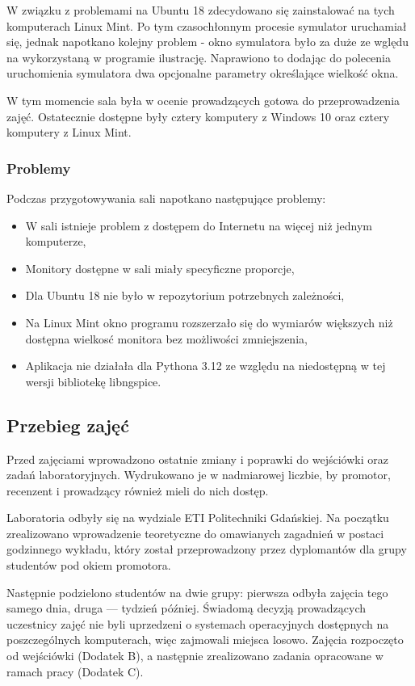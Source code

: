 W związku z problemami na Ubuntu 18 zdecydowano się zainstalować na tych komputerach Linux Mint. Po tym czasochłonnym procesie symulator uruchamiał się, jednak napotkano kolejny problem - okno symulatora było za duże ze wględu na wykorzystaną w programie ilustrację. Naprawiono to dodając do polecenia uruchomienia symulatora dwa opcjonalne parametry określające wielkość okna. 

W tym momencie sala była w ocenie prowadzących gotowa do przeprowadzenia zajęć. Ostatecznie dostępne były cztery komputery z Windows 10 oraz cztery komputery z Linux Mint.

\subsubsection{Problemy}
Podczas przygotowywania sali napotkano następujące problemy:
\begin{itemize}
    \item W sali istnieje problem z dostępem do Internetu na więcej niż jednym komputerze,
    \item Monitory dostępne w sali miały specyficzne proporcje,
    \item Dla Ubuntu 18 nie było w repozytorium potrzebnych zależności,
    \item Na Linux Mint okno programu rozszerzało się do wymiarów większych niż dostępna wielkosć monitora bez możliwości zmniejszenia,
    \item Aplikacja nie działała dla Pythona 3.12 ze względu na niedostępną w tej wersji bibliotekę libngspice.
\end{itemize}

\subsection{Przebieg zajęć}

Przed zajęciami wprowadzono ostatnie zmiany i poprawki do wejściówki oraz zadań laboratoryjnych. Wydrukowano je w nadmiarowej liczbie, by promotor, recenzent i prowadzący również mieli do nich dostęp.

Laboratoria odbyły się na wydziale ETI Politechniki Gdańskiej. Na początku zrealizowano wprowadzenie teoretyczne do omawianych zagadnień w postaci godzinnego
wykładu, który został przeprowadzony przez dyplomantów dla grupy studentów pod okiem promotora.

Następnie podzielono studentów na dwie grupy: pierwsza odbyła zajęcia tego samego dnia, druga --- tydzień później. Świadomą decyzją prowadzących uczestnicy zajęć nie byli uprzedzeni o systemach operacyjnych dostępnych na poszczególnych komputerach, więc zajmowali miejsca losowo. Zajęcia rozpoczęto od wejściówki (Dodatek B), a następnie zrealizowano zadania opracowane w ramach pracy (Dodatek C).

